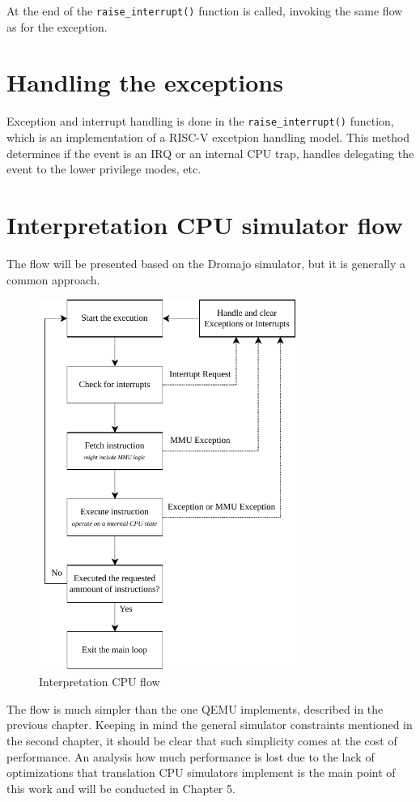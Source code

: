 \noindent
At the end of the \texttt{raise\_interrupt()} function is called, invoking the same flow as for the exception.

\section*{Handling the exceptions}

Exception and interrupt handling is done in the \texttt{raise\_interrupt()} function, which is an implementation of
a RISC-V excetpion handling model. This method determines if the event is an IRQ or an internal CPU trap, handles
delegating the event to the lower privilege modes, etc.

\pagebreak

\section{Interpretation CPU simulator flow}

The flow will be presented based on the Dromajo simulator, but it is generally a common approach.

\begin{figure}[h]
	\centering
	\includegraphics[width=0.75\textwidth]{figures/DromajoFlow.pdf}
	\caption{Interpretation CPU flow}
\end{figure}

\noindent
The flow is much simpler than the one QEMU implements, described in the previous chapter. Keeping in mind the general
simulator constraints mentioned in the second chapter, it should be clear that such simplicity comes at the cost of
performance. An analysis how much performance is lost due to the lack of optimizations that translation CPU simulators
implement is the main point of this work and will be conducted in Chapter 5.